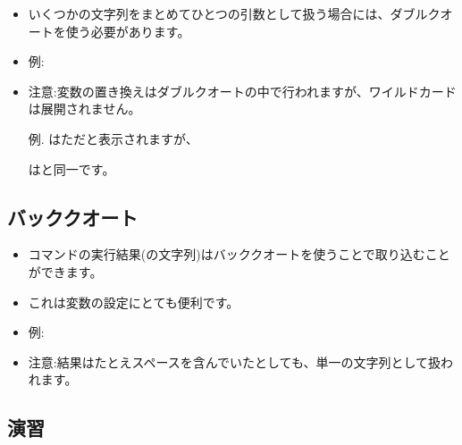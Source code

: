 \documentclass{jsarticle}
\begin{document}
\begin{itemize}

\item いくつかの文字列をまとめてひとつの引数として扱う場合には、ダブルクオート{\color{red}}を使う必要があります。

\item 例:

{\color{red}{\tt

\$ v=Hello World

\$ echo \$v

　Hello

\$ v="Hello World"

\$ echo \$v

　Hello World 
}}

\item 注意:変数の置き換えはダブルクオートの中で行われますが、ワイルドカードは展開されません。

例. {\color{red}}はただ{\color{red}\Q{*}}と表示されますが、

{\color{red}}は{\color{red}}と同一です。

\end{itemize}


\subsection{バッククオート}


\begin{itemize}
\item コマンドの実行結果(の文字列)はバッククオート{\color{red}}を使うことで取り込むことができます。
\item これは変数の設定にとても便利です。
\item 例:

{\color{red}{\tt

\$ v=`ls sub[13]*`

\$ echo \$v

　sub1\_t1.nii.gz sub1\_t2.nii.gz sub3\_pd.nii.gz

\$ echo `fslval sub1\_t1 pixdim2`

　4.0 
}}

\item 注意:結果はたとえスペースを含んでいたとしても、単一の文字列として扱われます。
\end{itemize}



\subsection*{演習}
\end{document}
